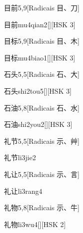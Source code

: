 \begin{entry}{目前}{5,9}[Radicais ⽬、⼑]
  \begin{phonetics}{目前}{mu4qian2}[][HSK 3]
  \end{phonetics}
\end{entry}

\begin{entry}{目标}{5,9}[Radicais ⽬、⽊]
  \begin{phonetics}{目标}{mu4biao1}[][HSK 3]
  \end{phonetics}
\end{entry}

\begin{entry}{石头}{5,5}[Radicais ⽯、⼤]
  \begin{phonetics}{石头}{shi2tou5}[][HSK 3]
  \end{phonetics}
\end{entry}

\begin{entry}{石油}{5,8}[Radicais ⽯、⽔]
  \begin{phonetics}{石油}{shi2you2}[][HSK 3]
  \end{phonetics}
\end{entry}

\begin{entry}{礼节}{5,5}[Radicais ⽰、⾋]
  \begin{phonetics}{礼节}{li3jie2}
  \end{phonetics}
\end{entry}

\begin{entry}{礼让}{5,5}[Radicais ⽰、⾔]
  \begin{phonetics}{礼让}{li3rang4}
  \end{phonetics}
\end{entry}

\begin{entry}{礼物}{5,8}[Radicais ⽰、⽜]
  \begin{phonetics}{礼物}{li3wu4}[][HSK 2]
  \end{phonetics}
\end{entry}

